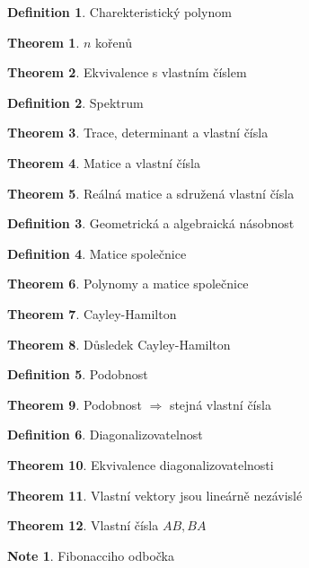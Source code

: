 \documentclass[a4paper]{article}
\theoremstyle{definition}
\newtheorem{definition}{Definition}
\newtheorem{theorem}{Theorem}
\newtheorem{note}{Note}
\begin{document}
\begin{definition}{Charekteristický polynom} \end{definition}
\begin{theorem}{$n$ kořenů} \end{theorem}
\begin{theorem}{Ekvivalence s vlastním číslem} \end{theorem}
\begin{definition}{Spektrum} \end{definition}
\begin{theorem}{Trace, determinant a vlastní čísla} \end{theorem}
\begin{theorem}{Matice a vlastní čísla} \end{theorem}
\begin{theorem}{Reálná matice a sdružená vlastní čísla} \end{theorem}
\begin{definition}{Geometrická a algebraická násobnost} \end{definition}
\begin{definition}{Matice společnice} \end{definition}
\begin{theorem}{Polynomy a matice společnice} \end{theorem}
\begin{theorem}{Cayley-Hamilton} \end{theorem}
\begin{theorem}{Důsledek Cayley-Hamilton} \end{theorem}
\begin{definition}{Podobnost} \end{definition}
\begin{theorem}{Podobnost $\Rightarrow$ stejná vlastní čísla} \end{theorem}
\begin{definition}{Diagonalizovatelnost} \end{definition}
\begin{theorem}{Ekvivalence diagonalizovatelnosti} \end{theorem}
\begin{theorem}{Vlastní vektory jsou lineárně nezávislé} \end{theorem}
\begin{theorem}{Vlastní čísla $AB, BA$} \end{theorem}
\begin{note}{Fibonacciho odbočka} \end{note}
\end{document}
